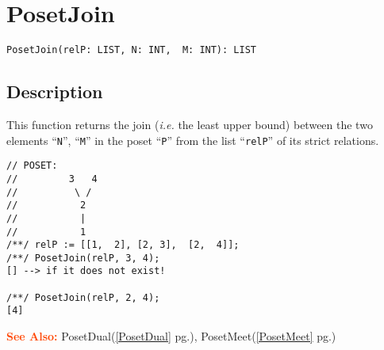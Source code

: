 \documentclass[a4paper]{mybook}
\newenvironment{command}{}{} %
\newcommand\SeeAlso{\par\textcolor{OrangeRed}{\textbf{\large See Also: }}}
\begin{document}
\section{PosetJoin}
\label{PosetJoin}
\begin{command} %


\begin{Verbatim}[label=syntax, rulecolor=\color{MidnightBlue},
frame=single]
PosetJoin(relP: LIST, N: INT,  M: INT): LIST
\end{Verbatim}


\subsection*{Description}

This function returns the join (\textit{i.e.} the least upper bound)
between the two elements ``\verb&N&'', ``\verb&M&'' in the poset ``\verb&P&''
from the list ``\verb&relP&'' of its strict relations.
\begin{Verbatim}[label=example, rulecolor=\color{PineGreen}, frame=single]
// POSET:
//         3   4
//          \ /
//           2
//           |
//           1
/**/ relP := [[1,  2], [2, 3],  [2,  4]];
/**/ PosetJoin(relP, 3, 4);
[] --> if it does not exist!

/**/ PosetJoin(relP, 2, 4);
[4]
\end{Verbatim}


\SeeAlso %
  PosetDual(\ref{PosetDual} pg.\pageref{PosetDual}), 
    PosetMeet(\ref{PosetMeet} pg.\pageref{PosetMeet})
\end{command} %
\end{document}
